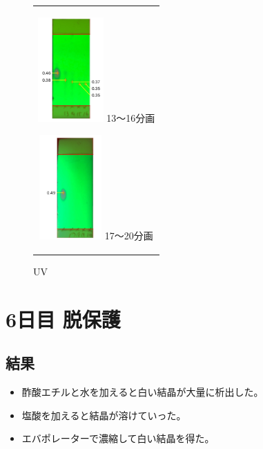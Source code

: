 \documentclass[a4paper,papersize,dvipdfmx]{jsarticle}
\begin{document}
\begin{figure}[H]
\begin{center}
\begin{tabular}{c}
\begin{minipage}{0.06\hsize}
        \hspace{2mm}
      \end{minipage}

\begin{minipage}{0.15\hsize}
\begin{center}
\includegraphics[clip,height=4cm]{imgs5/tlc-u4.jpg}
\hspace{1.6cm} 13〜16分画
\end{center}
\end{minipage}

\begin{minipage}{0.06\hsize}
        \hspace{2mm}
      \end{minipage}

\begin{minipage}{0.15\hsize}
\begin{center}
\includegraphics[clip, height=4cm]{imgs5/tlc-u5.jpg}
\hspace{1.6cm} 17〜20分画
\end{center}
\end{minipage}

\end{tabular}
\caption{UV}
\end{center}
\end{figure}



\section*{6日目 脱保護}
\subsection*{結果}
\begin{itemize}
\item 酢酸エチルと水を加えると白い結晶が大量に析出した。
\item 塩酸を加えると結晶が溶けていった。
\item エバポレーターで濃縮して白い結晶を得た。

\end{itemize}
\end{document}
